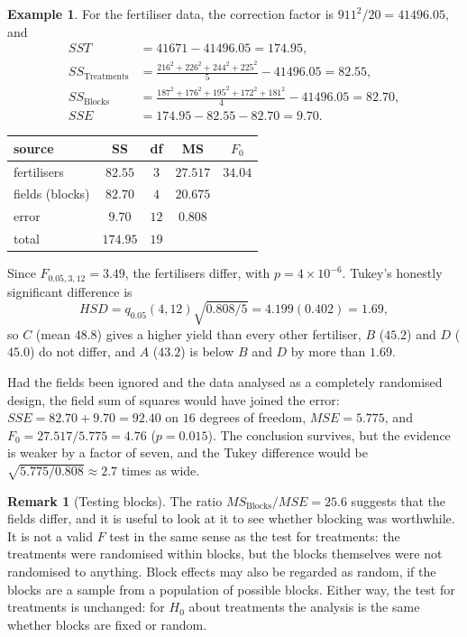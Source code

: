 \documentclass[11pt,a4paper]{article}
\numberwithin{equation}{section}
\theoremstyle{definition}
\newtheorem{exa}[thm]{Example}
\newtheorem*{remark}{Remark}
\begin{document}
\begin{exa}\label{exa:fertiliser-anova}
For the fertiliser data, the correction factor is $911^2/20 = 41496.05$, and
\begin{align*}
SST &= 41671 - 41496.05 = 174.95 , \\
SS_{\mathrm{Treatments}} &= \frac{216^2 + 226^2 + 244^2 + 225^2}{5} - 41496.05 = 82.55 , \\
SS_{\mathrm{Blocks}} &= \frac{187^2 + 176^2 + 195^2 + 172^2 + 181^2}{4} - 41496.05 = 82.70 , \\
SSE &= 174.95 - 82.55 - 82.70 = 9.70 .
\end{align*}
\begin{center}
\begin{tabular}{l|c|c|c|c}
source & SS & df & MS & $F_0$ \\
\hline
fertilisers & $82.55$ & $3$ & $27.517$ & $34.04$ \\
fields (blocks) & $82.70$ & $4$ & $20.675$ & \\
error & $9.70$ & $12$ & $0.808$ & \\
\hline
total & $174.95$ & $19$ & &
\end{tabular}
\end{center}
Since $F_{0.05,3,12} = 3.49$, the fertilisers differ, with $p = 4 \times 10^{-6}$. Tukey's honestly significant difference is
\[
HSD = q_{0.05}(4, 12)\sqrt{0.808/5} = 4.199(0.402) = 1.69 ,
\]
so $C$ (mean $48.8$) gives a
higher yield than every other fertiliser, $B$ ($45.2$) and $D$ ($45.0$) do not differ, and $A$ ($43.2$) is below $B$ and $D$ by more than $1.69$.

Had the fields been ignored and the data analysed as a completely randomised design, the field sum of squares would have joined the error:
$SSE = 82.70 + 9.70 = 92.40$ on $16$ degrees of freedom, $MSE = 5.775$, and $F_0 = 27.517/5.775 = 4.76$ ($p = 0.015$). The conclusion survives, but the evidence is
weaker by a factor of seven, and the Tukey difference would be $\sqrt{5.775/0.808} \approx 2.7$ times as wide.
\end{exa}

\begin{remark}[Testing blocks]
The ratio $MS_{\mathrm{Blocks}}/MSE = 25.6$ suggests that the fields differ, and it is useful to look at it to see whether blocking was worthwhile. It is not a valid
$F$ test in the same sense as the test for treatments: the treatments were randomised within blocks, but the blocks themselves were not
randomised to anything. Block effects may also be regarded as random, if the blocks are a sample from a population of possible blocks. Either
way, the test for treatments is unchanged: for $H_0$ about treatments the analysis is the same whether blocks are fixed or random.
\end{remark}
\end{document}
